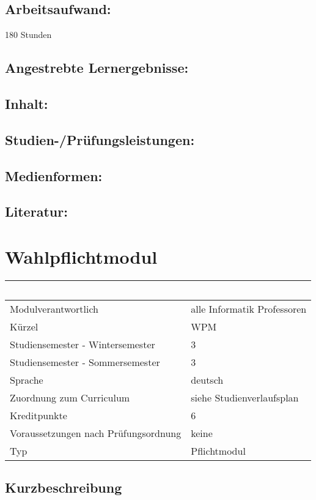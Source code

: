 \section*{Arbeitsaufwand:}\label{arbeitsaufwand-5}

180 Stunden

\section*{Angestrebte
Lernergebnisse:}\label{angestrebte-lernergebnisse-5}

\section*{Inhalt:}\label{inhalt-5}

\section*{Studien-/Prüfungsleistungen:}\label{studien-pruxfcfungsleistungen-5}

\section*{Medienformen:}\label{medienformen-5}

\section*{Literatur:}\label{literatur-5}

\chapter{Wahlpflichtmodul}\label{wahlpflichtmodul}

\begin{longtable}[]{@{}ll@{}}
\toprule
~ & ~\tabularnewline
\midrule
\endhead
Modulverantwortlich & alle Informatik Professoren\tabularnewline
Kürzel & WPM\tabularnewline
Studiensemester - Wintersemester & 3\tabularnewline
Studiensemester - Sommersemester & 3\tabularnewline
Sprache & deutsch\tabularnewline
Zuordnung zum Curriculum & siehe Studienverlaufsplan\tabularnewline
Kreditpunkte & 6\tabularnewline
Voraussetzungen nach Prüfungsordnung & keine\tabularnewline
Typ & Pflichtmodul\tabularnewline
\bottomrule
\end{longtable}

\section*{Kurzbeschreibung}\label{kurzbeschreibung-5}


